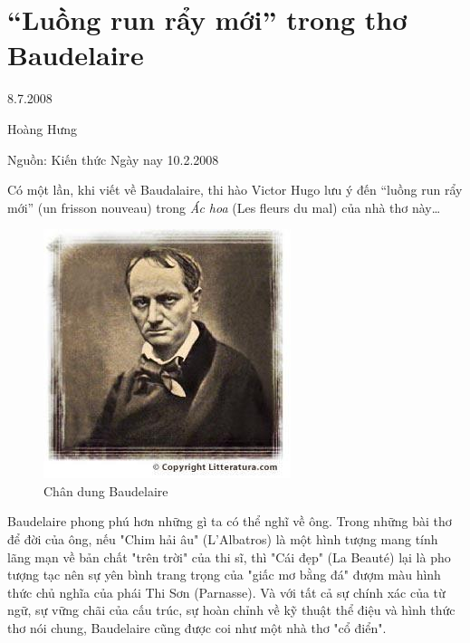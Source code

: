 \documentclass[../main.tex]{subfiles}
\begin{document}
\chapter{“Luồng run rẩy mới” trong thơ Baudelaire}

\begin{metadata}

\begin{flushright}8.7.2008\end{flushright}

Hoàng Hưng

Nguồn: Kiến thức Ngày nay 10.2.2008

\end{metadata}

\begin{multicols}{2}

Có một lần, khi viết về Baudalaire, thi hào Victor Hugo lưu ý đến “luồng run rẩy mới” (un frisson nouveau) trong \textit{Ác hoa} (Les fleurs du mal) của nhà thơ này… 
 
 \begin{figure}
	\centering
	\includegraphics[width=\textwidth]{../img/tho080708_1.jpg}
	\caption{Chân dung Baudelaire}
\end{figure}
 Baudelaire phong phú hơn những gì ta có thể nghĩ về ông. Trong những bài thơ để đời của ông, nếu "Chim hải âu" (L'Albatros) là một hình tượng mang tính lãng mạn về bản chất "trên trời" của thi sĩ, thì "Cái đẹp" (La Beauté) lại là pho tượng tạc nên sự yên bình trang trọng của "giấc mơ bằng đá" đượm màu hình thức chủ nghĩa của phái Thi Sơn (Parnasse). Và với tất cả sự chính xác của từ ngữ, sự vững chãi của cấu trúc, sự hoàn chỉnh về kỹ thuật thể điệu và hình thức thơ nói chung, Baudelaire cũng được coi như một nhà thơ "cổ điển". 
 

\end{multicols}
\end{document}

